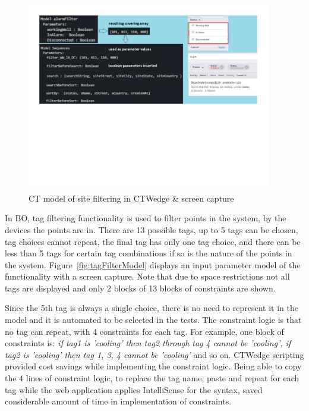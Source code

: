 \documentclass[conference]{IEEEtran}
\begin{document}
	\begin{figure}[!t]
		\centering
			\includegraphics[width=0.95\textwidth,]{siteFilterModel.pdf}
			\caption{CT model of site filtering in CTWedge \& screen capture}
			\label{fig:siteFilterModel}
	\end{figure}

	In BO, tag filtering functionality is used to filter points in the system, by the devices the points are in.
	There are 13 possible tags, up to 5 tags can be chosen, tag choices cannot repeat, the final tag has only one tag choice, and there can be less than 5 tags for certain tag combinations if so is the nature of the points in the system.
	Figure~\ref{fig:tagFilterModel} displays an input parameter model of the functionality with a screen capture. 
	Note that due to space restrictions not all tags are displayed and only 2 blocks of 13 blocks of constraints are shown.
	
	Since the 5th tag is always a single choice, there is no need to represent it in the model and it is automated to be selected in the tests.
	The constraint logic is that no tag can repeat, with 4 constraints for each tag.
	For example, one block of constraints is: \textit{if tag1 is 'cooling' then tag2 through tag 4 cannot be 'cooling', if tag2 is 'cooling' then tag 1, 3, 4 cannot be 'cooling'} and so on.
	CTWedge scripting provided cost savings while implementing the constraint logic. 
	Being able to copy the 4 lines of constraint logic, to replace the tag name, paste and repeat for each tag while the web application applies IntelliSense for the syntax, saved considerable amount of time in implementation of constraints.
\end{document}
